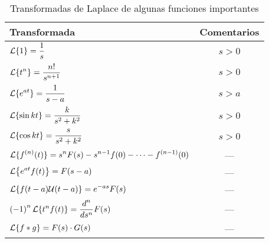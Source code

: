\documentclass[../ecuaciones_diferenciales.tex]{subfiles}
\begin{document}
\begin{table}[ht]
	\centering
	\begin{tabular}{l c}
		\toprule
		Transformada                                                       & Comentarios \\
		\midrule
		\(\displaystyle \operatorname{\mathcal{L}}\{1\} = \frac{1}{s}\)                      & \(s>0\) \\ [2ex]
		\(\displaystyle \operatorname{\mathcal{L}}\{t^n\} = \frac{n!}{s^{n+1}}\)             & \(s>0\) \\ [2ex]
		\(\displaystyle \operatorname{\mathcal{L}}\{e^{at}\} = \frac{1}{s-a}\)               & \(s>a\) \\ [2ex]
		\(\displaystyle \operatorname{\mathcal{L}}\{\sin kt\} = \frac{k}{s^2+k^2}\)          & \(s>0\) \\ [2ex]
		\(\displaystyle \operatorname{\mathcal{L}}\{\cos kt\} = \frac{s}{s^2+k^2}\)          & \(s>0\) \\ [2ex]
		\(\displaystyle \operatorname{\mathcal{L}}\{f^{(n)}(t)\} = s^n F(s) - s^{n-1} f(0) - \cdots -
		f^{(n-1)}(0)\)                                                     & --- \\ 	[2ex]
		\(\displaystyle \laplace\left\{e^{at}f(t)\right\} = F(s-a)\)       & --- \\		[2ex]
		\(\displaystyle \operatorname{\mathcal{L}}\{f(t-a)\mathcal{U}(t-a)\} = e^{-as}F(s)\) & --- \\		[2ex]
		\(\displaystyle {(-1)}^n \laplacetrans{t^n f(t)} = \frac{{\dif{}}^n}{\dif s^n}
		F(s)\)                                                       		& --- \\	[2ex]
		\(\displaystyle \operatorname{\mathcal{L}}\{f \ast g\} = F(s) \cdot G(s)\)           & --- \\		
		\bottomrule
	\end{tabular}%
	\caption{Transformadas de Laplace de algunas funciones importantes}
\end{table}
\end{document}
